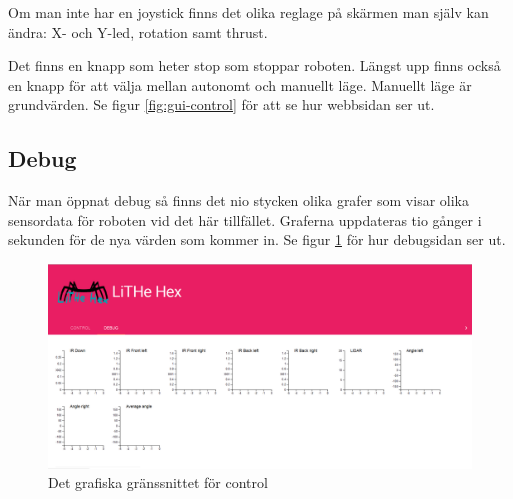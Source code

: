 \documentclass[a4paper,titlepage,12pt]{article}
\begin{document}
    Om man inte har en joystick finns det olika reglage på skärmen man själv kan
    ändra: X- och Y-led, rotation samt thrust.
	
	Det finns en knapp som heter stop som stoppar roboten. Längst upp finns
    också en knapp för att välja mellan autonomt och manuellt läge. Manuellt
    läge är grundvärden. Se figur \ref{fig:gui-control} för att se hur webbsidan
    ser ut.
	
	\subsection{Debug}\label{gui:debug}
	När man öppnat debug så finns det nio stycken olika grafer som visar olika
    sensordata för roboten vid det här tillfället. Graferna uppdateras tio
    gånger i sekunden för de nya värden som kommer in. Se figur
    \ref{fig:gui-debug} för hur debugsidan ser ut.
	
	\begin{figure}[h]
		\centering
		\includegraphics[width=0.5\linewidth]{images/gui-debug.png}
		\caption{Det grafiska gränssnittet för control\label{fig:gui-debug}}
	\end{figure}
	
\end{document}
